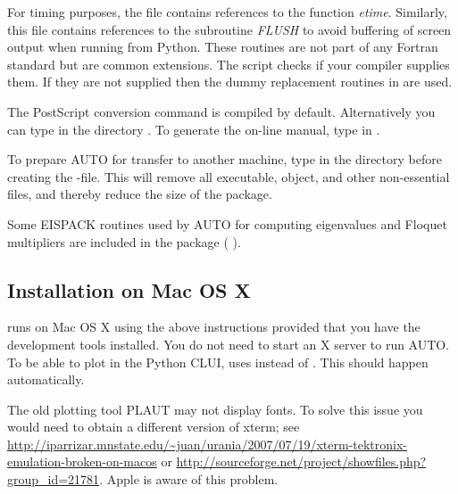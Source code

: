 \documentclass[12pt]{report}
\begin{document}
For timing purposes, the file 
contains references to the function {\it etime}.
Similarly, this file contains references to the
subroutine {\it FLUSH} to avoid buffering of screen output when
running \AUTO from Python. These routines are not part of any
Fortran standard but are common extensions. The 
script checks if your compiler supplies them. If they are not
supplied then the dummy replacement routines in 
are used.

The PostScript conversion command  is compiled by
default. Alternatively you can type  in the directory
.
To generate the on-line manual, type  in .

To prepare {\cal AUTO} for transfer to another machine,
type 
in the directory  before creating the -file. 
This will remove all executable, object, and other non-essential files, and
thereby reduce the size of the package.

Some {\cal EISPACK} routines used by {\cal AUTO} for computing eigenvalues and
Floquet multipliers are included in the package
( \citeyear{EISPACK:76}).

\subsection{Installation on Mac OS X}
\AUTO runs on Mac OS X using the above instructions provided that
you have the development tools
installed. You do not need to start an X server to run AUTO. To be able
to plot in the Python CLUI, \AUTO uses  instead of
. This should happen automatically.

The old plotting tool {\cal PLAUT} may not display fonts. To solve
this issue you would need to obtain a different version of xterm; see
\url{http://iparrizar.mnstate.edu/~juan/urania/2007/07/19/xterm-tektronix-emulation-broken-on-macos}
or 
\url{http://sourceforge.net/project/showfiles.php?group_id=21781}.
Apple is aware of this problem.
\end{document}
